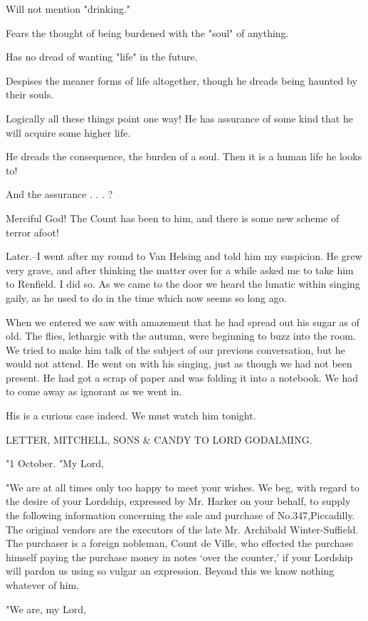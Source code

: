 Will not mention "drinking." 

Fears the thought of being burdened with the "soul" of anything. 

Has no dread of wanting "life" in the future. 

Despises the meaner forms of life altogether, though he dreads being haunted by their souls. 

Logically all these things point one way! He has assurance of some kind that he will acquire some higher life. 

He dreads the consequence, the burden of a soul. Then it is a human life he looks to! 

And the assurance . . . ? 

Merciful God! The Count has been to him, and there is some new scheme of terror afoot! 

Later.--I went after my round to Van Helsing and told him my suspicion. He grew very grave, and after thinking the matter over for a while asked me to take him to Renfield. I did so. As we came to the door we heard the lunatic within singing gaily, as he used to do in the time which now seems so long ago. 

When we entered we saw with amazement that he had spread out his sugar as of old. The flies, lethargic with the autumn, were beginning to buzz into the room. We tried to make him talk of the subject of our previous conversation, but he would not attend. He went on with his singing, just as though we had not been present. He had got a scrap of paper and was folding it into a notebook. We had to come away as ignorant as we went in. 

His is a curious case indeed. We must watch him tonight. 

LETTER, MITCHELL, SONS & CANDY TO LORD GODALMING. 

"1 October. "My Lord, 

"We are at all times only too happy to meet your wishes. We beg, with regard to the desire of your Lordship, expressed by Mr. Harker on your behalf, to supply the following information concerning the sale and purchase of No.347,Piccadilly. The original vendors are the executors of the late Mr. Archibald Winter-Suffield. The purchaser is a foreign nobleman, Count de Ville, who effected the purchase himself paying the purchase money in notes `over the counter,' if your Lordship will pardon us using so vulgar an expression. Beyond this we know nothing whatever of him. 

"We are, my Lord, 

